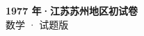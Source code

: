 \documentclass[zihao=-4, a4paper]{ctexart}
\begin{document}
\begin{center}
  {\Large\bfseries 1977 年·江苏苏州地区初试卷}\\[4pt]
  {\large 数学 · 试题版}
\end{center}
\medskip
{}

\end{document}
